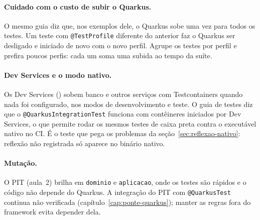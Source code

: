 \paragraph{Cuidado com o custo de subir o Quarkus.}
O mesmo guia diz que, nos exemplos dele, o Quarkus sobe uma vez para
todos os testes. Um teste com \texttt{@TestProfile} diferente do anterior
faz o Quarkus ser desligado e iniciado de novo com o novo perfil. Agrupe
os testes por perfil e prefira poucos perfis: cada um soma uma subida ao
tempo da suíte.

\paragraph{Dev Services e o modo nativo.}
Os Dev Services () sobem banco e
outros serviços com Testcontainers quando nada foi configurado, nos
modos de desenvolvimento e teste. O guia de testes diz que o
\texttt{@QuarkusIntegrationTest} funciona com contêineres iniciados por
Dev Services, o que permite rodar os mesmos testes de caixa preta contra
o executável nativo no CI. É o teste que pega os problemas da
seção~\ref{sec:reflexao-nativo}: reflexão não registrada só aparece no
binário nativo.

\paragraph{Mutação.}
O PIT (aula~2) brilha em \texttt{dominio} e \texttt{aplicacao}, onde os
testes são rápidos e o código não depende do Quarkus. A integração do
PIT com \texttt{@QuarkusTest} continua não verificada
(capítulo~\ref{cap:ponte-quarkus}); manter as regras fora do framework
evita depender dela.
